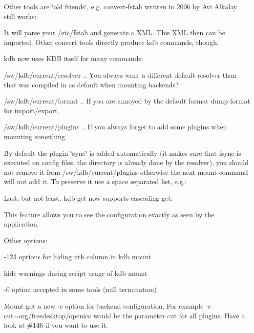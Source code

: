 \begin{DoxyCode}{0}
\end{DoxyCode}


Other tools are \char`\"{}old friends\char`\"{}, e.\+g. convert-\/fstab written in 2006 by Avi Alkalay still works\+:


\begin{DoxyCode}{0}
\end{DoxyCode}


It will parse your /etc/fstab and generate a X\+ML. This X\+ML then can be imported. Other convert tools directly produce kdb commands, though.

kdb now uses K\+DB itself for many commands\+:


\begin{DoxyItemize}
\item /sw/kdb/current/resolver .. You always want a different default resolver than that was compiled in as default when mounting backends?
\item /sw/kdb/current/format .. If you are annoyed by the default format dump format for import/export.
\item /sw/kdb/current/plugins .. If you always forget to add some plugins when mounting something.
\end{DoxyItemize}

By default the plugin \char`\"{}sync\char`\"{} is added automatically (it makes sure that fsync is executed on config files, the directory is already done by the resolver), you should not remove it from /sw/kdb/current/plugins otherwise the next mount command will not add it. To preserve it use a space separated list, e.\+g.\+:


\begin{DoxyCode}{0}
\end{DoxyCode}


Last, but not least, kdb get now supports cascading get\+:


\begin{DoxyCode}{0}
\end{DoxyCode}


This feature allows you to see the configuration exactly as seen by the application.

Other options\+:


\begin{DoxyItemize}
\item -\/123 options for hiding nth column in {\ttfamily kdb mount}
\item hide warnings during script usage of {\ttfamily kdb mount}
\item -\/0 option accepted in some tools (null termination)
\item Mount got a new -\/c option for backend configuration. For example -\/c cut=org/freedesktop/openicc would be the parameter cut for all plugins. Have a look at \#146 if you want to use it.
\end{DoxyItemize}

